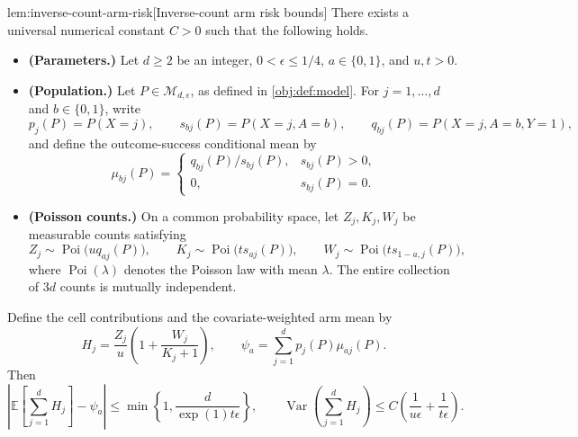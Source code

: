 \documentclass[11pt]{article}
\begin{document}
\begin{lemmav}{lem:inverse-count-arm-risk}[Inverse-count arm risk bounds]
There exists a universal numerical constant \(C>0\) such that the following holds.
\begin{itemize}
\item \textbf{(Parameters.)} Let \(d\ge 2\) be an integer, \(0<\epsilon\le 1/4\), \(a\in\{0,1\}\), and \(u,t>0\).
\item \textbf{(Population.)} Let \(P\in\mathcal M_{d,\epsilon}\), as defined in \cref{obj:def:model}. For \(j=1,\ldots,d\) and \(b\in\{0,1\}\), write
\[
p_j(P)=P(X=j),\qquad
s_{bj}(P)=P(X=j,A=b),\qquad
q_{bj}(P)=P(X=j,A=b,Y=1),
\]
and define the outcome-success conditional mean by
\[
\mu_{bj}(P)=
\begin{cases}
q_{bj}(P)/s_{bj}(P),&s_{bj}(P)>0,\\
0,&s_{bj}(P)=0.
\end{cases}
\]
\item \textbf{(Poisson counts.)} On a common probability space, let \(Z_j,K_j,W_j\) be measurable counts satisfying
\[
Z_j\sim\operatorname{Poi}\!\bigl(uq_{aj}(P)\bigr),\qquad
K_j\sim\operatorname{Poi}\!\bigl(ts_{aj}(P)\bigr),\qquad
W_j\sim\operatorname{Poi}\!\bigl(ts_{1-a,j}(P)\bigr),
\]
where \(\operatorname{Poi}(\lambda)\) denotes the Poisson law with mean \(\lambda\). The entire collection of \(3d\) counts is mutually independent.
\end{itemize}
Define the cell contributions and the covariate-weighted arm mean by
\[
H_j=\frac{Z_j}{u}\left(1+\frac{W_j}{K_j+1}\right),
\qquad
\psi_a=\sum_{j=1}^{d}p_j(P)\mu_{aj}(P).
\]
Then
\[
\left|\mathbb E\!\left[\sum_{j=1}^{d}H_j\right]-\psi_a\right|
\le
\min\left\{1,\frac{d}{\exp(1)t\epsilon}\right\},
\qquad
\operatorname{Var}\!\left(\sum_{j=1}^{d}H_j\right)
\le
C\left(\frac{1}{u\epsilon}+\frac{1}{t\epsilon}\right).
\]
\end{lemmav}
\end{document}
